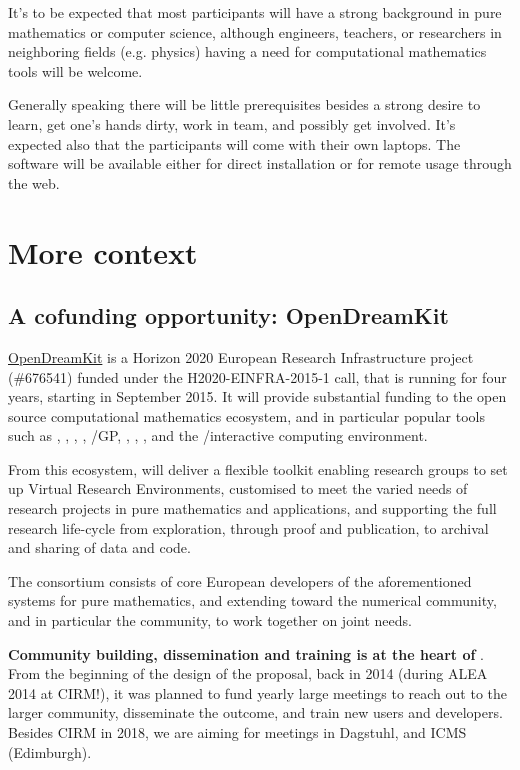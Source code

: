 \documentclass[12pt]{amsart}
\begin{document}
It's to be expected that most participants will have a strong
background in pure mathematics or computer science, although
engineers, teachers, or researchers in neighboring fields (e.g. physics)
having a need for computational mathematics tools will be
welcome.

Generally speaking there will be little prerequisites besides a strong
desire to learn, get one's hands dirty, work in team, and possibly get
involved. It's expected also that the participants will come with
their own laptops. The software will be available either for direct
installation or for remote usage through the web.

\section{More context}

\subsection{A cofunding opportunity: OpenDreamKit}

\href{http://opendreamkit.org}{OpenDreamKit} is a Horizon 2020
European Research Infrastructure project (\#676541) funded under the
H2020-EINFRA-2015-1 call, that is running for four years, starting in
September 2015. It will provide substantial funding to the open source
computational mathematics ecosystem, and in particular popular tools
such as \Linbox, \MPIR, \Sage, \GAP, \Pari/GP, \LMFDB, \Singular,
\MathHub, and the \IPython/\Jupyter interactive computing environment.

From this ecosystem, \ODK will deliver a flexible toolkit enabling
research groups to set up Virtual Research Environments, customised to
meet the varied needs of research projects in pure mathematics and
applications, and supporting the full research life-cycle from
exploration, through proof and publication, to archival and sharing of
data and code.

The \ODK  consortium consists of core European developers of the
aforementioned systems for pure mathematics, and extending toward the
numerical community, and in particular the \Jupyter  community, to work
together on joint needs.

\textbf{Community building, dissemination and training is at the heart of \ODK}. From the
beginning of the design of the proposal, back in 2014 (during ALEA
2014 at CIRM!), it was planned to fund yearly large meetings to reach
out to the larger community, disseminate the outcome, and train new
users and developers. Besides CIRM in 2018, we are aiming for meetings
in Dagstuhl, and ICMS (Edimburgh).
\end{document}
